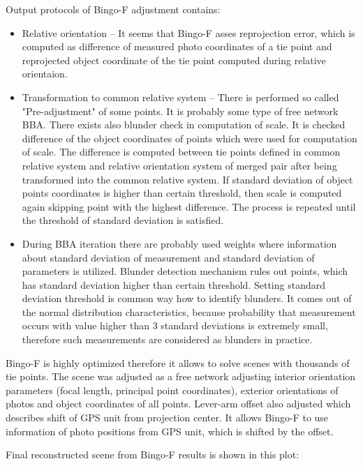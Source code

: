 \documentclass[a4paper,12pt]{article}
\begin{document}
Output  protocols of Bingo-F adjustment contains: 
\begin{itemize}
\item Relative orientation -- It seems that Bingo-F asses reprojection error, which is computed 
as difference of measured photo coordinates of a tie point and reprojected object coordinate of the tie point computed during relative orientaion.
\item Transformation to common relative system -- There is performed so called "Pre-adjustment" of some points. It is probably some type of free network 
BBA. There exists also blunder check in computation of scale. It is checked difference of the object coordinates of points 
which were used for computation of scale. The difference is computed between tie points defined in common relative system 
and relative orientation system of merged pair after being transformed into the common relative system.
If standard deviation of object points coordinates is higher than certain threshold, then 
scale is computed again skipping point with the highest difference.
The process is repeated  until  the threshold of standard deviation is satisfied.  
\item During BBA iteration there are probably used weights where information about standard deviation of measurement 
and standard deviation of parameters is utilized. Blunder detection mechanism rules out points, which 
has standard deviation higher than certain threshold. Setting standard deviation threshold  is common way how to identify 
blunders. It comes out of the normal distribution characteristics, because probability that measurement occurs with value 
 higher than 3 standard deviations is extremely small, therefore such measurements are considered as blunders in practice.
\end{itemize}

Bingo-F is highly optimized therefore it allows to solve scenes with thousands of tie points.
The scene was adjusted as a free network adjusting interior orientation parameters (focal length, principal point coordinates),
exterior orientations of photos and object coordinates of all points. Lever-arm offset also adjusted which describes 
shift of GPS unit from projection center.  It allows Bingo-F to use information of photo positions from GPS unit,
which is shifted by the offset.  

Final reconstructed  scene from Bingo-F results is shown in this plot:

\end{document}
